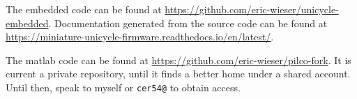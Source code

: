 \documentclass[main.tex]{subfiles}
\begin{document}
The embedded code can be found at \url{https://github.com/eric-wieser/unicycle-embedded}.
Documentation generated from the source code can be found at \url{https://miniature-unicycle-firmware.readthedocs.io/en/latest/}.

The matlab code can be found at \url{https://github.com/eric-wieser/pilco-fork}.
It is current a private repository, until it finds a better home under a shared account.
Until then, speak to myself or \texttt{cer54@} to obtain access.
\end{document}
